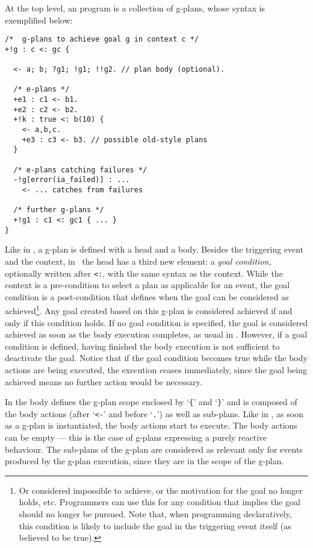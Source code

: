 At the top level, an {\aser} program is a collection of g-plans, whose
syntax is exemplified below:
%
%
{\small
\begin{verbatim}
/*  g-plans to achieve goal g in context c */
+!g : c <: gc { 

  <- a; b; ?g1; !g1; !!g2. // plan body (optional).

  /* e-plans */
  +e1 : c1 <- b1.	
  +e2 : c2 <- b2.
  +!k : true <: b(10) {
    <- a,b,c.
    +e3 : c3 <- b3. // possible old-style plans
  }	
  
  /* e-plans catching failures */
  -!g[error(ia_failed)] : ...
    <- ... catches from failures 

  /* further g-plans */
  +!g1 : c1 <: gc1 { ... }
}
\end{verbatim}}

Like in {\asl}, a g-plan is defined with a head and a body.
%
Besides the triggering event and the context, in \aser\ the head has a
third new element: a \emph{goal condition}, optionally written after
\texttt{<:}, with the same syntax as the context. While the context is
a pre-condition to select a plan as applicable for an event, the goal
condition is a post-condition that defines when the goal can be
considered as achieved\footnote{Or considered impossible to achieve,
  or the motivation for the goal no longer holds, etc. Programmers can
  use this for any condition that implies the goal should no longer be
  pursued. Note that, when programming declaratively, this condition
  is likely to include the goal in the triggering event itself (as
  believed to be true).}. Any goal created based on this g-plan is
considered achieved if and only if
this condition holds. If no goal condition is specified, the goal is
considered achieved as soon as the body execution completes, as usual
in \asl. However, if a goal condition is defined, having finished the
body execution is not sufficient to deactivate the goal. Notice that
if the goal condition becomes true while the body actions are being
executed, the execution ceases immediately, since the goal being
achieved means no further action would be necessary.

In {\aser} the body defines the g-plan scope enclosed by `\texttt{\{}'
and `\texttt{\}}' and is composed of the body actions (after `\texttt{<-}'
and before `\texttt{.}')  as well as sub-plans.
%
Like in {\asl}, as soon as a g-plan is instantiated, the body actions
start to execute. The body actions can be empty --- this is the case
of g-plans expressing a purely reactive behaviour.
%
The sub-plans of the g-plan are considered as relevant only for events
produced by the g-plan execution, since they are in the scope of the g-plan.

